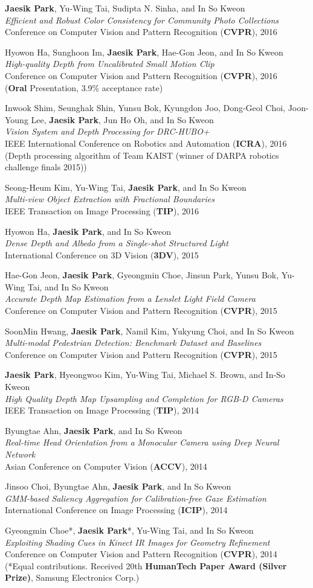 \documentclass[letterpaper,11pt]{article}
\newcommand{\publicationItem}[4]{
  \small{
  \item{#1\\ \emph{#2}\\ #3\\ #4}
  }
}
\begin{document}
    \publicationItem{\textbf{Jaesik Park}, Yu-Wing Tai, Sudipta N. Sinha, and In So Kweon}{Efficient and Robust Color Consistency for Community Photo Collections}{Conference on Computer Vision and Pattern Recognition (\textbf{CVPR}), 2016}{}
    \publicationItem{Hyowon Ha, Sunghoon Im, \textbf{Jaesik Park}, Hae-Gon Jeon, and In So Kweon}{High-quality Depth from Uncalibrated Small Motion Clip}{Conference on Computer Vision and Pattern Recognition (\textbf{CVPR}), 2016}{(\textbf{Oral} Presentation, 3.9\% acceptance rate)}
    \publicationItem{Inwook Shim, Seunghak Shin, Yunsu Bok, Kyungdon Joo, Dong-Geol Choi, Joon-Young Lee, \textbf{Jaesik Park}, Jun Ho Oh, and In So Kweon}{Vision System and Depth Processing for DRC-HUBO+}{IEEE International Conference on Robotics and Automation (\textbf{ICRA}), 2016}{(Depth processing algorithm of Team KAIST (winner of DARPA robotics challenge finals 2015))}
    \publicationItem{Seong-Heum Kim, Yu-Wing Tai, \textbf{Jaesik Park}, and In So Kweon}{Multi-view Object Extraction with Fractional Boundaries}{IEEE Transaction on Image Processing (\textbf{TIP}), 2016}{}
    \publicationItem{Hyowon Ha, \textbf{Jaesik Park}, and In So Kweon}{Dense Depth and Albedo from a Single-shot Structured Light}{International Conference on 3D Vision (\textbf{3DV}), 2015}{}
    \publicationItem{Hae-Gon Jeon, \textbf{Jaesik Park}, Gyeongmin Choe, Jinsun Park, Yunsu Bok, Yu-Wing Tai, and In So Kweon}{Accurate Depth Map Estimation from a Lenslet Light Field Camera}{Conference on Computer Vision and Pattern Recognition (\textbf{CVPR}), 2015}{}
    \publicationItem{SoonMin Hwang, \textbf{Jaesik Park}, Namil Kim, Yukyung Choi, and In So Kweon}{Multi-modal Pedestrian Detection: Benchmark Dataset and Baselines}{Conference on Computer Vision and Pattern Recognition (\textbf{CVPR}), 2015}{}
    \publicationItem{\textbf{Jaesik Park}, Hyeongwoo Kim, Yu-Wing Tai, Michael S. Brown, and In-So Kweon}{High Quality Depth Map Upsampling and Completion for RGB-D Cameras}{IEEE Transaction on Image Processing (\textbf{TIP}), 2014}{}
    \publicationItem{Byungtae Ahn, \textbf{Jaesik Park}, and In So Kweon}{Real-time Head Orientation from a Monocular Camera using Deep Neural Network}{Asian Conference on Computer Vision (\textbf{ACCV}), 2014}{}
    \publicationItem{Jinsoo Choi, Byungtae Ahn, \textbf{Jaesik Park}, and In So Kweon}{GMM-based Saliency Aggregation for Calibration-free Gaze Estimation}{International Conference on Image Processing (\textbf{ICIP}), 2014}{}
    \publicationItem{Gyeongmin Choe*, \textbf{Jaesik Park}*, Yu-Wing Tai, and In So Kweon}{Exploiting Shading Cues in Kinect IR Images for Geometry Refinement}{Conference on Computer Vision and Pattern Recognition (\textbf{CVPR}), 2014}{(*Equal contributions. Received 20th \textbf{HumanTech Paper Award (Silver Prize)}, Samsung Electronics Corp.)}
\end{document}
